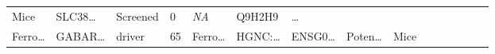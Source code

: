 \documentclass[
]{article}
\begin{document}
\begin{longtable}[]{@{}lllllllllllllll@{}}
\begin{minipage}[t]{0.05\columnwidth}
Mice\strut
\end{minipage} & \begin{minipage}[t]{0.05\columnwidth}\raggedright
SLC38\ldots{}\strut
\end{minipage} & \begin{minipage}[t]{0.05\columnwidth}\raggedright
Screened\strut
\end{minipage} & \begin{minipage}[t]{0.05\columnwidth}\raggedright
0\strut
\end{minipage} & \begin{minipage}[t]{0.05\columnwidth}\raggedright
\emph{NA}\strut
\end{minipage} & \begin{minipage}[t]{0.05\columnwidth}\raggedright
Q9H2H9\strut
\end{minipage} & \begin{minipage}[t]{0.02\columnwidth}\raggedright
\ldots{}\strut
\end{minipage}\tabularnewline
\begin{minipage}[t]{0.05\columnwidth}\raggedright
Ferro\ldots{}\strut
\end{minipage} & \begin{minipage}[t]{0.05\columnwidth}\raggedright
GABAR\ldots{}\strut
\end{minipage} & \begin{minipage}[t]{0.04\columnwidth}\raggedright
driver\strut
\end{minipage} & \begin{minipage}[t]{0.02\columnwidth}\raggedright
65\strut
\end{minipage} & \begin{minipage}[t]{0.05\columnwidth}\raggedright
Ferro\ldots{}\strut
\end{minipage} & \begin{minipage}[t]{0.05\columnwidth}\raggedright
HGNC:\ldots{}\strut
\end{minipage} & \begin{minipage}[t]{0.05\columnwidth}\raggedright
ENSG0\ldots{}\strut
\end{minipage} & \begin{minipage}[t]{0.05\columnwidth}\raggedright
Poten\ldots{}\strut
\end{minipage} & \begin{minipage}[t]{0.05\columnwidth}\raggedright
Mice\strut
\end{minipage} & \begin{minipage}[t]{0.05\columnwidth}\raggedright

\end{minipage}
\end{longtable}
\end{document}
